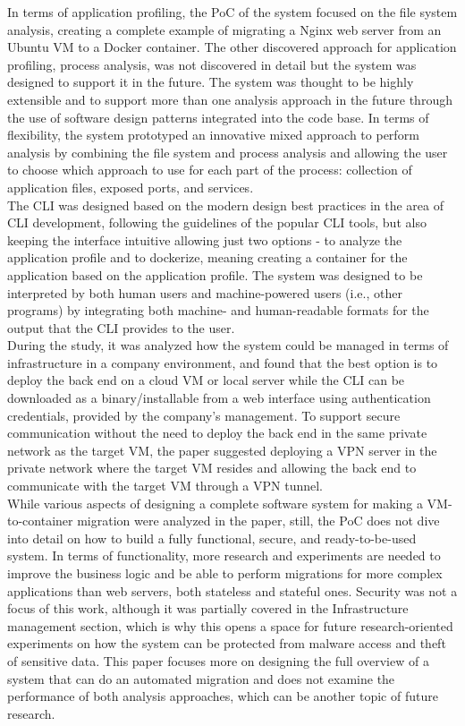 \documentclass[twocolumn]{article}
\begin{document}
In terms of application profiling, the PoC of the system focused on the file system analysis, creating a complete example of migrating a Nginx web server from an Ubuntu VM to a Docker container. The other discovered approach for application profiling, process analysis, was not discovered in detail but the system was designed to support it in the future. The system was thought to be highly extensible and to support more than one analysis approach in the future through the use of software design patterns integrated into the code base. In terms of flexibility, the system prototyped an innovative mixed approach to perform analysis by combining the file system and process analysis and allowing the user to choose which approach to use for each part of the process: collection of application files, exposed ports, and services. \\

The CLI was designed based on the modern design best practices in the area of CLI development, following the guidelines of the popular CLI tools, but also keeping the interface intuitive allowing just two options - to analyze the application profile and to dockerize, meaning creating a container for the application based on the application profile. The system was designed to be interpreted by both human users and machine-powered users (i.e., other programs) by integrating both machine- and human-readable formats for the output that the CLI provides to the user. \\

During the study, it was analyzed how the system could be managed in terms of infrastructure in a company environment, and found that the best option is to deploy the back end on a cloud VM or local server while the CLI can be downloaded as a binary/installable from a web interface using authentication credentials, provided by the company's management. To support secure communication without the need to deploy the back end in the same private network as the target VM, the paper suggested deploying a VPN server in the private network where the target VM resides and allowing the back end to communicate with the target VM through a VPN tunnel. \\

While various aspects of designing a complete software system for making a VM-to-container migration were analyzed in the paper, still, the PoC does not dive into detail on how to build a fully functional, secure, and ready-to-be-used system. In terms of functionality, more research and experiments are needed to improve the business logic and be able to perform migrations for more complex applications than web servers, both stateless and stateful ones. Security was not a focus of this work, although it was partially covered in the Infrastructure management section, which is why this opens a space for future research-oriented experiments on how the system can be protected from malware access and theft of sensitive data. This paper focuses more on designing the full overview of a system that can do an automated migration and does not examine the performance of both analysis approaches, which can be another topic of future research. \\
\end{document}
